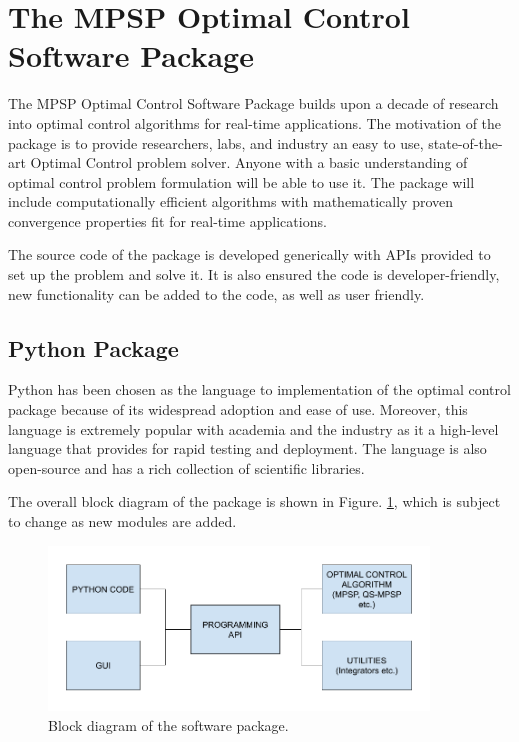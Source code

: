 \documentclass[12pt]{article}
\begin{document}
\section{The MPSP Optimal Control Software Package }
The MPSP Optimal Control Software Package builds upon a decade of research into optimal control algorithms for real-time applications. The motivation of the package is to provide researchers, labs, and industry an easy to use, state-of-the-art Optimal Control problem solver. Anyone with a basic understanding of optimal control problem formulation will be able to use it. The package will include computationally efficient algorithms with mathematically proven convergence properties fit for real-time applications.

The source code of the package is developed generically with APIs provided to set up the problem and solve it. It is also ensured the code is developer-friendly, new functionality can be added to the code, as well as user friendly.

\subsection{Python Package}
Python has been chosen as the language to implementation of the optimal control package because of its widespread adoption and ease of use. Moreover, this language is extremely popular with academia and the industry as it a high-level language that provides for rapid testing and deployment. The language is also open-source and has a rich collection of scientific libraries.

The overall block diagram of the package is shown in Figure. \ref{fig:SoftwarePacakgeFlow}, which is subject to change as new modules are added.
\begin{figure}[h]
    \centering
    \includegraphics[width=0.9\textwidth]{img/CodeStructure.png}
    \caption{Block diagram of the software package.}
    \label{fig:SoftwarePacakgeFlow}
\end{figure}
\end{document}

